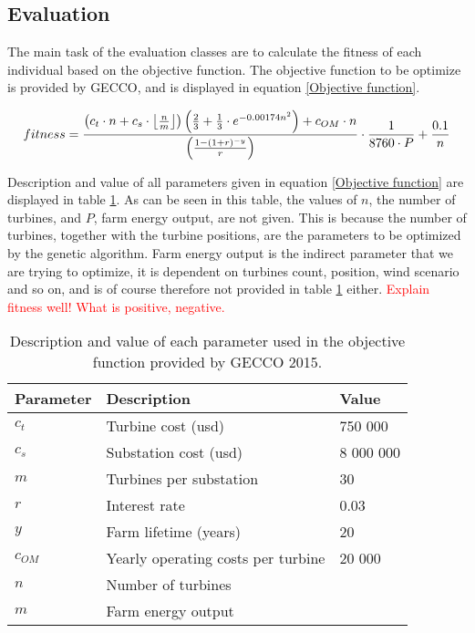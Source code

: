 \subsection{Evaluation}


The main task of the evaluation classes are to calculate the fitness of each individual based on the objective function.  The objective function to be optimize is provided by GECCO, and is displayed in equation \ref{Objective function}.\\

\begin{small}
\begin{equation}
fitness =  \frac{ \left( c_t \cdot n + c_s \cdot \floor*{\frac{n}{m}} \right) \left( \frac{2}{3} + \frac{1}{3} \cdot e^{-0.00174n^2} \right) + c_{OM} \cdot n}{\left( \frac{1 - (1 + r)^{-y}}{r} \right) } \cdot \frac{1}{8760 \cdot P} + \frac{0.1}{n}
\label{Objective function} 
\end{equation}
\end{small}


\noindent Description and value of all parameters given in equation \ref{Objective function} are displayed in table \ref{Parameters}. As can be seen in this table, the values of $n$, the number of turbines, and $P$, farm energy output, are not given. This is because the number of turbines, together with the turbine positions, are the parameters to be optimized by the genetic algorithm. Farm energy output is the indirect parameter that we are trying to optimize, it is dependent on turbines count, position, wind scenario and so on, and is of course therefore not provided in table \ref{Parameters} either. \textcolor{red}{Explain fitness well! What is positive, negative.}\\


\begin{table}[h!]
\begin{center}
\caption{Description and value of each parameter used in the objective function provided by GECCO 2015.}
\label{Parameters}
\begin{tabular}{l|l|l}
\textbf{Parameter} & \textbf{Description} & \textbf{Value} \\ 
\hline 
$c_t$ & Turbine cost (usd) & 750 000 \\ 
$c_s$ & Substation cost (usd) & 8 000 000 \\ 
$m$ & Turbines per substation & 30 \\ 
$r$ & Interest rate & 0.03 \\ 
$y$ & Farm lifetime (years) & 20 \\ 
$c_{OM}$ & Yearly operating costs per turbine & 20 000 \\ 
$n$ & Number of turbines &  \\ 
$m$ & Farm energy output &  \\  
\end{tabular} 
\end{center}
\end{table}


